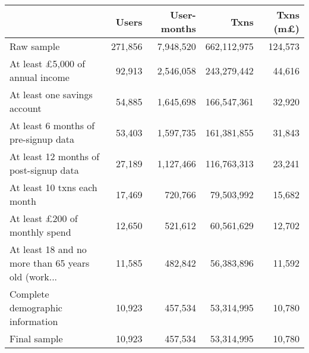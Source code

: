 \begin{tabular}{lrrrr}
\toprule
                                                   &   Users & User-months &        Txns & Txns (m\pounds) \\
\midrule
                                        Raw sample & 271,856 &   7,948,520 & 662,112,975 &         124,573 \\
            At least \pounds5,000 of annual income &  92,913 &   2,546,058 & 243,279,442 &          44,616 \\
                      At least one savings account &  54,885 &   1,645,698 & 166,547,361 &          32,920 \\
              At least 6 months of pre-signup data &  53,403 &   1,597,735 & 161,381,855 &          31,843 \\
            At least 12 months of post-signup data &  27,189 &   1,127,466 & 116,763,313 &          23,241 \\
                       At least 10 txns each month &  17,469 &     720,766 &  79,503,992 &          15,682 \\
              At least \pounds200 of monthly spend &  12,650 &     521,612 &  60,561,629 &          12,702 \\
At least 18 and no more than 65 years old (work... &  11,585 &     482,842 &  56,383,896 &          11,592 \\
                  Complete demographic information &  10,923 &     457,534 &  53,314,995 &          10,780 \\
                                      Final sample &  10,923 &     457,534 &  53,314,995 &          10,780 \\
\bottomrule
\end{tabular}
